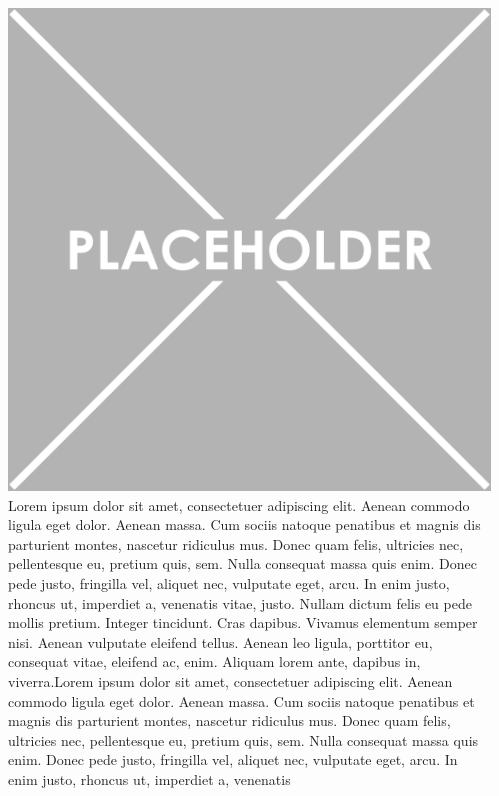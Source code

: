 \documentclass[25pt, , innermargin=-1in, blockverticalspace=0in, blockbodyinnersep=0in]{tikzposter}
\begin{document}
\begin{columns}
{        \includegraphics[width=0.3\linewidth]{assets/placeholder.png}\\
        Lorem ipsum dolor sit amet, consectetuer adipiscing elit. Aenean commodo ligula eget dolor. Aenean massa. Cum sociis natoque penatibus et magnis dis parturient montes, nascetur ridiculus mus. Donec quam felis, ultricies nec, pellentesque eu, pretium quis, sem. Nulla consequat massa quis enim. Donec pede justo, fringilla vel, aliquet nec, vulputate eget, arcu. In enim justo, rhoncus ut, imperdiet a, venenatis vitae, justo. Nullam dictum felis eu pede mollis pretium. Integer tincidunt. Cras dapibus. Vivamus elementum semper nisi. Aenean vulputate eleifend tellus. Aenean leo ligula, porttitor eu, consequat vitae, eleifend ac, enim. Aliquam lorem ante, dapibus in, viverra.Lorem ipsum dolor sit amet, consectetuer adipiscing elit. Aenean commodo ligula eget dolor. Aenean massa. Cum sociis natoque penatibus et magnis dis parturient montes, nascetur ridiculus mus. Donec quam felis, ultricies nec, pellentesque eu, pretium quis, sem. Nulla consequat massa quis enim. Donec pede justo, fringilla vel, aliquet nec, vulputate eget, arcu. In enim justo, rhoncus ut, imperdiet a, venenatis
      }
      \begin{subcolumns}
          \block{}{
}
\end{subcolumns}
\end{columns}
\end{document}
